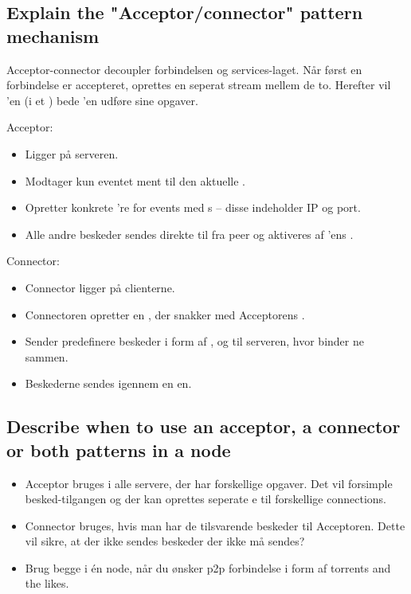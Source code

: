 \documentclass{article}
\begin{document}
\subsection{Explain the "Acceptor/connector" pattern mechanism}
Acceptor-connector decoupler forbindelsen og services-laget.
Når først en forbindelse er accepteret, oprettes en seperat stream mellem de to.
Herefter vil 'en (i et ) bede 'en udføre sine opgaver.

Acceptor:
\vspace{-10pt}
\begin{itemize}
	\item Ligger på serveren.
	\item Modtager kun eventet   ment til den aktuelle .
	\item Opretter konkrete 're for events med s  -- disse indeholder IP og port.
	\item Alle andre beskeder sendes direkte til  fra peer og aktiveres af 'ens .
\end{itemize}

Connector:
\vspace{-10pt}
\begin{itemize}
	\item Connector ligger på clienterne.
	\item Connectoren opretter en , der snakker med Acceptorens .
	\item Sender predefinere beskeder i form af ,  og  til serveren, hvor  binder ne sammen.
	\item Beskederne sendes igennem en en.
\end{itemize}



\subsection{Describe when to use an acceptor, a connector or both patterns in a node}
\begin{itemize}
	\item Acceptor bruges i alle servere, der har forskellige opgaver.
	Det vil forsimple besked-tilgangen og der kan oprettes seperate e til forskellige connections.
	\item Connector bruges, hvis man har de tilsvarende beskeder til Acceptoren. 
	Dette vil sikre, at der ikke sendes beskeder der ikke må sendes?

	\item Brug begge i én node, når du ønsker p2p forbindelse i form af torrents and the likes.
\end{itemize}
\end{document}

